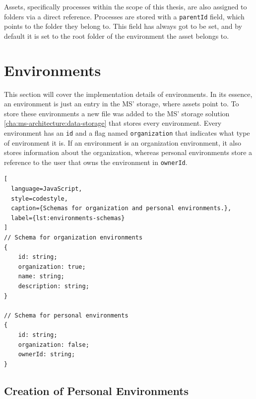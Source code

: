 Assets, specifically processes within the scope of this thesis,
are also assigned to folders via a direct reference.
Processes are stored with a \lstinline{parentId} field,
which points to the folder they belong to.
This field has always got to be set, and by default it is set to the root folder of the
environment the asset belongs to.

\section{Environments}


This section will cover the implementation details of environments.
In its essence, an environment is just an entry in the MS' storage, where assets point to.
To store these environments a new file was added to the MS' storage solution
\ref{cha:ms-architecture:data-storage} that stores every environment.
Every environment has an \lstinline{id} and a flag named \lstinline{organization} that
indicates what type of environment it is.
If an environment is an organization environment, it also stores information about the
organization,
whereas personal environments store a reference to the user that owns the environment in
\lstinline{ownerId}.

\begin{lstlisting}[
  language=JavaScript,
  style=codestyle,
  caption={Schemas for organization and personal environments.},
  label={lst:environments-schemas}
]
// Schema for organization environments
{
    id: string;
    organization: true;
    name: string;
    description: string;
}

// Schema for personal environments
{
    id: string;
    organization: false;
    ownerId: string;
}
\end{lstlisting}

\subsection{Creation of Personal Environments}

%
%

